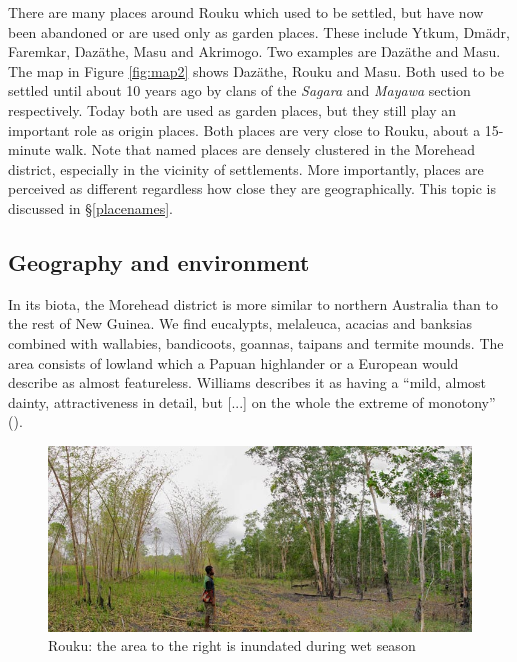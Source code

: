 There are many places around Rouku which used to be settled, but have now been abandoned or are used only as garden places. These include Ytkum, Dmädr, Faremkar, Ŋazäthe, Masu and Akrimogo. Two examples are Ŋazäthe and Masu. The map in Figure \ref{fig:map2} shows Ŋazäthe, Rouku and Masu. Both used to be settled until about 10 years ago by clans of the \emph{Sagara} and \emph{Mayawa} section respectively. Today both are used as garden places, but they still play an important role as origin places. Both places are very close to Rouku, about a 15-minute walk. Note that named places are densely clustered in the Morehead district, especially in the vicinity of settlements. More importantly, places are perceived as different regardless how close they are geographically. This topic is discussed in \S\ref{placenames}.

\subsection{Geography and environment}\label{geographyenviro}

In its biota, the Morehead district is more similar to northern Australia than to the rest of New Guinea. We find eucalypts, melaleuca, acacias and banksias combined with wallabies, bandicoots, goannas, taipans and termite mounds. The area consists of lowland which a Papuan highlander or a European would describe as almost featureless. Williams describes it as having a ``mild, almost dainty, attractiveness in detail, but [...] on the whole the extreme of monotony'' (\citeyear[1]{Williams:1936transfly}).

\begin{figure}
    \includegraphics[width=.9\textwidth]{figures/landscape1.jpg}
  \caption[The highest water level during wet season]{Rouku: the area to the right is inundated during wet season}
  \label{fig:landscape1}
\end{figure}

